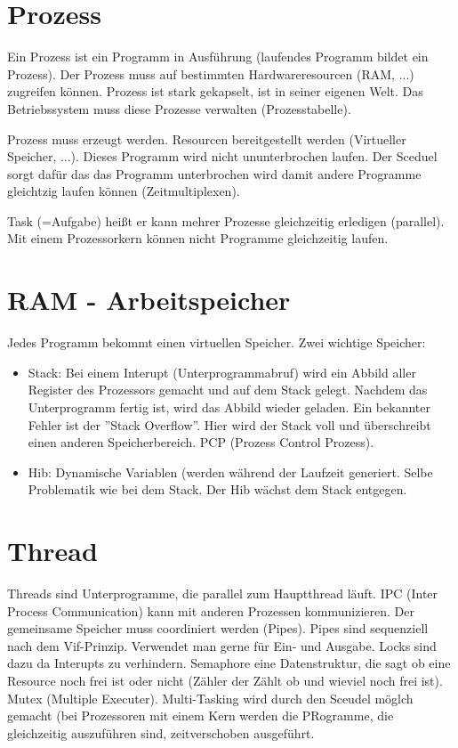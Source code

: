 \documentclass[a4paper]{report}
\begin{document}
\chapter{Prozess}

Ein Prozess ist ein Programm in Ausführung (laufendes Programm bildet ein Prozess). Der Prozess muss auf bestimmten Hardwareresourcen (RAM, ...) zugreifen können. Prozess ist stark gekapselt, ist in seiner eigenen Welt. Das Betriebssystem muss diese Prozesse verwalten (Prozesstabelle).

Prozess muss erzeugt werden. Resourcen bereitgestellt werden (Virtueller Speicher, ...). Dieses Programm wird nicht ununterbrochen laufen. Der Sceduel sorgt dafür das das Programm unterbrochen wird damit andere Programme gleichtzig laufen können (Zeitmultiplexen).

Task (=Aufgabe) heißt er kann mehrer Prozesse gleichzeitig erledigen (parallel). Mit einem Prozessorkern können nicht Programme gleichzeitig laufen.


\chapter{RAM - Arbeitspeicher}

Jedes Programm bekommt einen virtuellen Speicher. Zwei wichtige Speicher:

\begin{itemize}
\item Stack: Bei einem Interupt (Unterprogrammabruf) wird ein Abbild aller Register des Prozessors gemacht und auf dem Stack gelegt. Nachdem das Unterprogramm fertig ist, wird das Abbild wieder geladen. Ein bekannter Fehler ist der ''Stack Overflow''. Hier wird der Stack voll und überschreibt einen anderen Speicherbereich. PCP (Prozess Control Prozess).
\item Hib: Dynamische Variablen (werden während der Laufzeit generiert. Selbe Problematik wie bei dem Stack. Der Hib wächst dem Stack entgegen.
\end{itemize}

\chapter{Thread}

Threads sind Unterprogramme, die parallel zum Hauptthread läuft. IPC (Inter Process Communication) kann mit anderen Prozessen kommunizieren.
Der gemeinsame Speicher muss coordiniert werden (Pipes). Pipes sind sequenziell nach dem Vif-Prinzip. Verwendet man gerne für Ein- und Ausgabe. Locks sind dazu da Interupts zu verhindern. Semaphore eine Datenstruktur, die sagt ob eine Resource noch frei ist oder nicht (Zähler der Zählt ob und wieviel noch frei ist). Mutex (Multiple Executer). Multi-Tasking wird durch den Sceudel möglch gemacht (bei Prozessoren mit einem Kern werden die PRogramme, die gleichzeitig auszuführen sind, zeitverschoben ausgeführt. 
\end{document}
